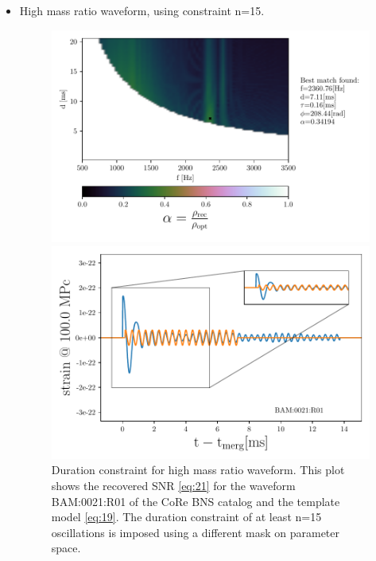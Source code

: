 \begin{itemize}[leftmargin=*]


\item High mass ratio waveform, using constraint n=15.

\begin{figure}[!htbp]
\begin{center}
\begin{minipage}[t]{0.5\linewidth}
\vspace{0pt}
\includegraphics[scale=0.6,trim={2mm 0 35mm 0},clip]{images/Data_analysis/results/2D_grid_13.pdf}
\end{minipage}%
\begin{minipage}[t]{0.5\linewidth}
\vspace{20pt}
\includegraphics[scale=0.45]{images/Data_analysis/results/2D_grid_14.pdf}
\end{minipage}
\captionsetup{width=0.8\textwidth}
\caption[Duration constraint for high mass ratio waveform]{Duration constraint for high mass ratio waveform. This plot shows the recovered SNR \ref{eq:21} for the waveform BAM:0021:R01 of the CoRe BNS catalog \cite{Dietrich:2018phi} and the template model \ref{eq:19}. The duration constraint of at least n=15 oscillations is imposed using a different mask on parameter space.}
\end{center}
\end{figure}


\end{itemize}
